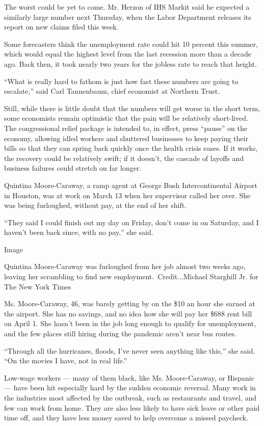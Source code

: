 The worst could be yet to come. Mr. Herzon of IHS Markit said he
expected a similarly large number next Thursday, when the Labor
Department releases its report on new claims filed this week.

Some forecasters think the unemployment rate could hit 10 percent this
summer, which would equal the highest level from the last recession more
than a decade ago. Back then, it took nearly two years for the jobless
rate to reach that height.

``What is really hard to fathom is just how fast these numbers are going
to escalate,'' said Carl Tannenbaum, chief economist at Northern Trust.

Still, while there is little doubt that the numbers will get worse in
the short term, some economists remain optimistic that the pain will be
relatively short-lived. The congressional relief package is intended to,
in effect, press ``pause'' on the economy, allowing idled workers and
shuttered businesses to keep paying their bills so that they can spring
back quickly once the health crisis eases. If it works, the recovery
could be relatively swift; if it doesn't, the cascade of layoffs and
business failures could stretch on far longer.

Quintina Moore-Caraway, a ramp agent at George Bush Intercontinental
Airport in Houston, was at work on March 13 when her supervisor called
her over. She was being furloughed, without pay, at the end of her
shift.

``They said I could finish out my day on Friday, don't come in on
Saturday, and I haven't been back since, with no pay,'' she said.

Image

Quintina Moore-Caraway was furloughed from her job almost two weeks ago,
leaving her scrambling to find new employment.~Credit...Michael
Starghill Jr. for The New York Times

Ms. Moore-Caraway, 46, was barely getting by on the \$10 an hour she
earned at the airport. She has no savings, and no idea how she will pay
her \$688 rent bill on April 1. She hasn't been in the job long enough
to qualify for unemployment, and the few places still hiring during the
pandemic aren't near bus routes.

``Through all the hurricanes, floods, I've never seen anything like
this,'' she said. ``On the movies I have, not in real life.''

Low-wage workers --- many of them black, like Ms. Moore-Caraway, or
Hispanic --- have been hit especially hard by the sudden economic
reversal. Many work in the industries most affected by the outbreak,
such as restaurants and travel, and few can work from home. They are
also less likely to have sick leave or other paid time off, and they
have less money saved to help overcome a missed paycheck.

